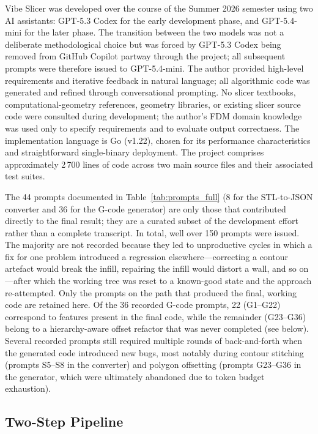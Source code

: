\documentclass[10pt,twocolumn,a4paper]{article}
\begin{document}
Vibe Slicer was developed over the course of the Summer 2026
semester using two AI assistants: GPT-5.3 Codex for the early
development phase, and GPT-5.4-mini for the later phase. The
transition between the two models was not a deliberate
methodological choice but was forced by GPT-5.3 Codex being
removed from GitHub Copilot partway through the project; all
subsequent prompts were therefore issued to GPT-5.4-mini.
The author provided high-level requirements and iterative
feedback in natural language; all algorithmic code was generated
and refined through conversational prompting.
No slicer textbooks, computational-geometry references, geometry
libraries, or existing slicer source code were consulted during
development; the author's FDM domain knowledge was used only to
specify requirements and to evaluate output correctness.
The implementation language is Go (v1.22), chosen for its
performance characteristics and straightforward single-binary
deployment. The project comprises approximately 2\,700 lines of
code across two main source files and their associated test suites.

The 44 prompts documented in Table~\ref{tab:prompts_full}
(8 for the STL-to-JSON converter and 36 for the G-code generator)
are only those that contributed directly to the final result;
they are a curated subset of the development effort rather than a
complete transcript. In total, well over 150 prompts were issued.
The majority are not recorded because they led to unproductive
cycles in which a fix for one problem introduced a regression
elsewhere—correcting a contour artefact would break the infill,
repairing the infill would distort a wall, and so on—after which
the working tree was reset to a known-good state and the approach
re-attempted. Only the prompts on the path that produced the
final, working code are retained here. Of the 36 recorded G-code
prompts, 22 (G1--G22) correspond to features present in the final
code, while the remainder (G23--G36) belong to a hierarchy-aware
offset refactor that was never completed (see below). Several
recorded prompts still required multiple rounds of back-and-forth
when the generated code introduced new bugs, most notably during
contour stitching (prompts S5--S8 in the converter) and polygon
offsetting (prompts G23--G36 in the generator, which were ultimately
abandoned due to token budget exhaustion).

\subsection{Two-Step Pipeline}
\end{document}
